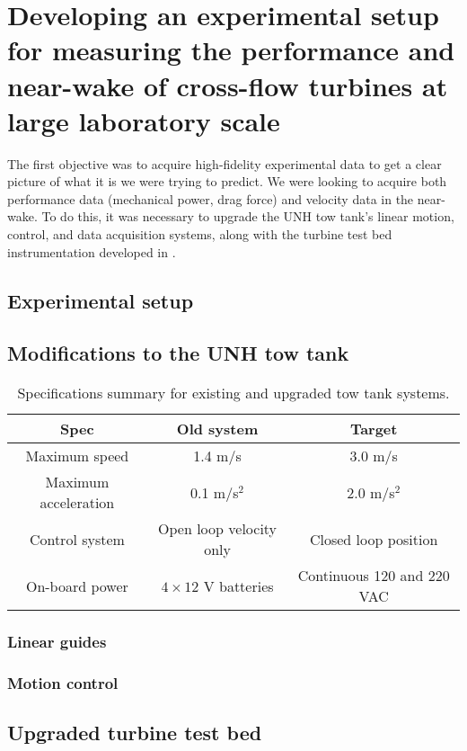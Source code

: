 \chapter{Developing an experimental setup for measuring the performance and
near-wake of cross-flow turbines at large laboratory scale}

The first objective was to acquire high-fidelity experimental data to get a
clear picture of what it is we were trying to predict. We were looking to
acquire both performance data (mechanical power, drag force) and velocity data
in the near-wake. To do this, it was necessary to upgrade the UNH tow tank's
linear motion, control, and data acquisition systems, along with the turbine
test bed instrumentation developed in \cite{Bachant2011MS}.

\section{Experimental setup}


\section{Modifications to the UNH tow tank}

\begin{table}
\centering
\begin{tabular}{c|c|c}
Spec & Old system & Target \\ 
\hline
Maximum speed & 1.4 m/s  & 3.0 m/s \\ 
Maximum acceleration & 0.1 m/s$^2$ & 2.0 m/s$^2$ \\ 
Control system & Open loop velocity only & Closed loop position \\ 
On-board power & $4\times12$ V batteries & Continuous 120 and 220 VAC \\ 
\end{tabular}
\caption{Specifications summary for existing and upgraded tow tank systems.} 
\label{tab:tow-tank-specs}
\end{table}

\subsection{Linear guides}


\subsection{Motion control}


\section{Upgraded turbine test bed}